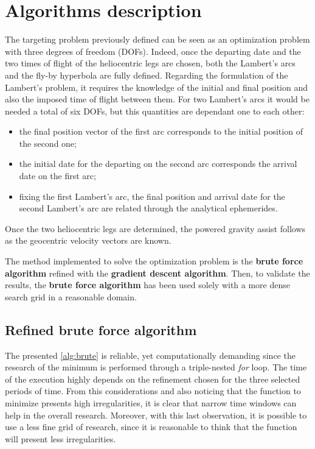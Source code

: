 \section{Algorithms description}
\label{sec:algo_description}

The targeting problem previously defined can be seen as an optimization problem with three degrees of freedom (DOFs). Indeed, once the departing date and the two times of flight of the heliocentric legs are chosen, both the Lambert's arcs and the fly-by hyperbola are fully defined.  
Regarding the formulation of the Lambert's problem, it requires the knowledge of the initial and final position and also the imposed time of flight between them. For two Lambert's arcs it would be needed a total of six DOFs, but this quantities are dependant one to each other:
\begin{itemize}
    [wide,itemsep=3pt,topsep=3pt]
    \item the final position vector of the first arc corresponds to the initial position of the second one;
    \item the initial date for the departing on the second arc corresponds the arrival date on the first arc;
    \item fixing the first Lambert's arc, the final position and arrival date for the second Lambert's arc are related through the analytical ephemerides.
\end{itemize}

Once the two heliocentric legs are determined, the powered gravity assist follows as the geocentric velocity vectors are known.

The method implemented to solve the optimization problem is the \textbf{brute force algorithm} refined with the \textbf{gradient descent algorithm}. Then, to validate the results, the \textbf{brute force algorithm} has been used solely with a more dense search grid in a reasonable domain. 

\subsection{Refined brute force algorithm}
\label{subsec:brute_force_algo}

The presented \autoref{alg:brute} is reliable, yet  computationally demanding since the research of the minimum is performed through a triple-nested \textit{for} loop. The time of the execution highly depends on the refinement chosen for the three selected periods of time. From this considerations and also noticing that the function to minimize presents high irregularities, it is clear that narrow time windows can help in the overall research. Moreover, with this last observation, it is possible to use a less fine grid of research, since it is reasonable to think that the function will present less irregularities.


